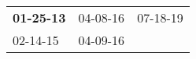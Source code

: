 \begin{supertabular}{p{0.33\columnwidth}p{0.33\columnwidth}p{0.33\columnwidth}}
 \textbf{01-25-13\textsuperscript{}} &  04-08-16\textsuperscript{} &  07-18-19\textsuperscript{} \\
          02-14-15\textsuperscript{} &  04-09-16\textsuperscript{} &                             \\
\end{supertabular}
